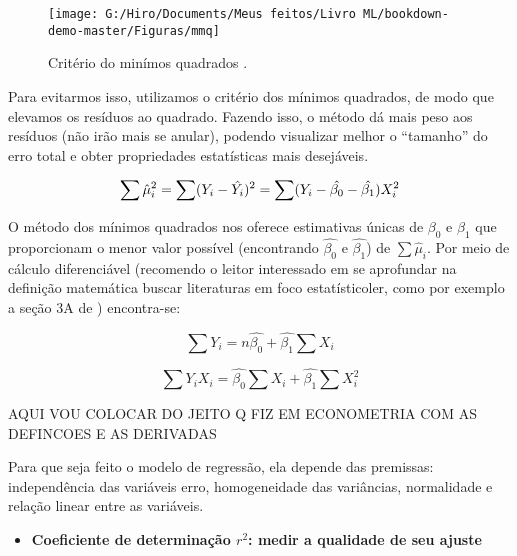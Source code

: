 \documentclass[
]{book}
\providecommand{\tightlist}{%
  \setlength{\itemsep}{0pt}\setlength{\parskip}{0pt}}
\begin{document}
\begin{figure}

{\centering \texttt{[image: G:/Hiro/Documents/Meus feitos/Livro ML/bookdown-demo-master/Figuras/mmq]} 

}

\caption{Critério do minímos quadrados \citet{gujarati2011econometria}.}\label{fig:mmq}
\end{figure}



Para evitarmos isso, utilizamos o critério dos mínimos quadrados, de modo que elevamos os resíduos ao quadrado. Fazendo isso, o método dá mais peso aos resíduos (não irão mais se anular), podendo visualizar melhor o ``tamanho'' do erro total e obter propriedades estatísticas mais desejáveis.

\begin{equation}
    \sum \hat{\mu}^2_i=\sum(Y_i-\hat{Y_i})^2 \\ = \sum (Y_i-\hat{\beta_0}-\hat{\beta_1})X_i^2 
    \label{eq:mmqeq}
\end{equation}

O método dos mínimos quadrados nos oferece estimativas únicas de \(\beta_0\) e \(\beta_1\) que proporcionam o menor valor possível (encontrando \(\hat{\beta_0}\) e \(\hat{\beta_1}\)) de \(\sum \hat{\mu}_i\). Por meio de cálculo diferenciável (recomendo o leitor interessado em se aprofundar na definição matemática buscar literaturas em foco estatísticoler, como por exemplo a seção 3A de \citet{gujarati2011econometria}) encontra-se:

\begin{equation}
    \sum Y_i=n\hat{\beta_0} + \hat{\beta_1} \sum X_i
    \label{eq:sumyi}
\end{equation}

\begin{equation}
    \sum Y_i X_i=\hat{\beta_0} \sum X_i + \hat{\beta_1} \sum X_i^2
    \label{eq:sumyixi}
\end{equation}

AQUI VOU COLOCAR DO JEITO Q FIZ EM ECONOMETRIA COM AS DEFINCOES E AS DERIVADAS

Para que seja feito o modelo de regressão, ela depende das premissas: independência das variáveis erro, homogeneidade das variâncias, normalidade e relação linear entre as variáveis.

\begin{itemize}
\tightlist
\item
  \textbf{Coeficiente de determinação \(r^2\): medir a qualidade de seu ajuste}
\end{itemize}
\end{document}
